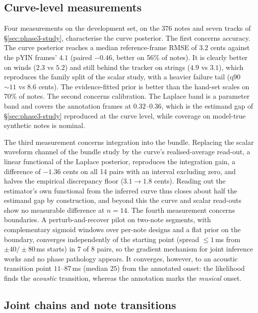 \subsection{Curve-level measurements}

Four measurements on the development set, on the 376 notes and seven tracks
of \S\ref{sec:phase3-study}, characterise the curve posterior. The first
concerns accuracy. The curve posterior reaches a median reference-frame RMSE
of $3.2$ cents against the pYIN frames' $4.1$ (paired $-0.46$, better on
56\% of notes). It is clearly better on winds ($2.3$ vs $5.2$) and still
behind the tracker on strings ($4.9$ vs $3.1$), which reproduces the family
split of the scalar study, with a heavier failure tail (q90 $\sim 11$ vs
$8.6$ cents). The evidence-fitted prior is better than the hand-set scales
on 70\% of notes. The second concerns calibration. The Laplace band is a
parameter band and covers the annotation frames at $0.32$--$0.36$, which is
the estimand gap of \S\ref{sec:phase3-study} reproduced at the curve level,
while coverage on model-true synthetic notes is nominal.

The third measurement concerns integration into the bundle. Replacing the
scalar waveform channel of the bundle study by the curve's realised-average
read-out, a linear functional of the Laplace posterior, reproduces the
integration gain, a difference of $-1.36$ cents on all 14 pairs with an
interval excluding zero, and halves the empirical discrepancy floor
($3.1 \to 1.8$ cents). Reading out the estimator's own functional from the
inferred curve thus closes about half the estimand gap by construction,
and beyond this the curve and scalar read-outs show no measurable
difference at $n=14$. The fourth measurement concerns boundaries. A
perturb-and-recover pilot on two-note segments, with complementary sigmoid
windows over per-note designs and a flat prior on the boundary, converges
independently of the starting point (spread $\le 1$\,ms from
$\pm 40/\pm 80$\,ms starts) in 7 of 8 pairs, so the gradient mechanism for
joint inference works and no phase pathology appears. It converges, however,
to an acoustic transition point $11$--$87$\,ms (median $25$) from the
annotated onset: the likelihood finds the \emph{acoustic} transition,
whereas the annotation marks the \emph{musical} onset.

\subsection{Joint chains and note transitions}

